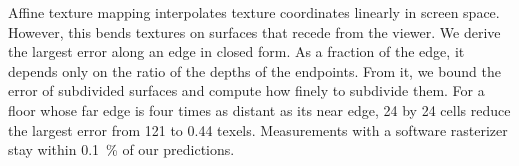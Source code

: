 Affine texture mapping interpolates texture coordinates linearly in screen space.
However, this bends textures on surfaces that recede from the viewer.
We derive the largest error along an edge in closed form.
As a fraction of the edge, it depends only on the ratio of the depths of the endpoints.
From it, we bound the error of subdivided surfaces and compute how finely to subdivide them.
For a floor whose far edge is four times as distant as its near edge, 24 by 24 cells reduce the largest error from 121 to 0.44 texels.
Measurements with a software rasterizer stay within \qty{0.1}{\percent} of our predictions.
